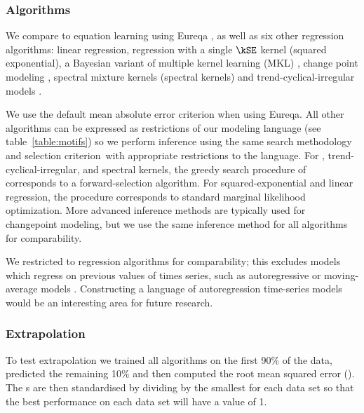 \subsubsection{Algorithms}

We compare \procedurename{} to equation learning using Eureqa \citep{Eureqa}, as well as six other regression algorithms: linear regression, \gp{} regression with a single $\kSE$ kernel (squared exponential), a Bayesian variant of multiple kernel learning (MKL) \citep[e.g.][]{bach2004multiple}, change point modeling \citep[e.g.][]{garnett2010sequential, saatcci2010gaussian, FoxDunson:NIPS2012}, spectral mixture kernels \citep{WilAda13} (spectral kernels) and trend-cyclical-irregular models \citep[e.g.][]{lind2006basic}.

We use the default mean absolute error criterion when using Eureqa.
All other algorithms can be expressed as restrictions of our modeling language (see table~\ref{table:motifs}) so we perform inference using the same search methodology and selection criterion\footnotemark~with appropriate restrictions to the language.
For \MKL{}, trend-cyclical-irregular, and spectral kernels, the greedy search procedure of \procedurename{} corresponds to a forward-selection algorithm.
For squared-exponential and linear regression, the procedure corresponds to standard marginal likelihood optimization.
More advanced inference methods are typically used for changepoint modeling, but we use the same inference method for all algorithms for comparability.

We restricted to regression algorithms for comparability; this excludes models which regress on previous values of times series, such as autoregressive or moving-average models \citep[e.g.][]{box2013time}.
Constructing a language of autoregression time-series models would be an interesting area for future research.



\subsubsection{Extrapolation}

To test extrapolation we trained all algorithms on the first 90\% of the data, predicted the remaining 10\% and then computed the root mean squared error (\RMSE{}).
The \RMSE{}s are then standardised by dividing by the smallest \RMSE{} for each data set so that the best performance on each data set will have a value of 1.

